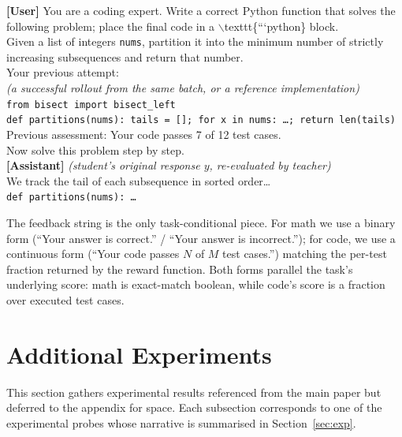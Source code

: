 \documentclass{llmxive}
\begin{document}
\begin{tcolorbox}[breakable,colback=gray!3,colframe=gray!50,title={\small Code (LiveCodeBench v6 / Dolci-RLZero) --- self-teacher context},fonttitle=\bfseries\small,boxrule=0.5pt,arc=2pt,left=4pt,right=4pt,top=2pt,bottom=2pt]
  \small\ttfamily
  {\textbf{[User]}} {You are a coding expert. Write a correct Python function that solves the following problem; place the final code in a $\backslash$texttt\{```python\} block.}\\
  {Given a list of integers \texttt{nums}, partition it into the minimum number of strictly increasing subsequences and return that number.}\\[3pt]
  Your previous attempt:\\
  \textrm{\textit{(a successful rollout from the same batch, or a reference implementation)}}\\
  \texttt{from bisect import bisect\_left}\\
  \texttt{def partitions(nums): tails = []; for x in nums: \ldots; return len(tails)}\\[3pt]
  {Previous assessment: Your code passes 7 of 12 test cases.}\\[3pt]
  Now solve this problem step by step.\\[3pt]
  {\textbf{[Assistant]}} {\textit{(student's original response $y$, re-evaluated by teacher)}}\\
  {We track the tail of each subsequence in sorted order\ldots}\\
  {\texttt{def partitions(nums): \ldots}}
\end{tcolorbox}

The feedback string is the only task-conditional piece. For math we use a binary form (``Your answer is correct.'' / ``Your answer is incorrect.''); for code, we use a continuous form (``Your code passes $N$ of $M$ test cases.'') matching the per-test fraction returned by the reward function. Both forms parallel the task's underlying score: math is exact-match boolean, while code's score is a fraction over executed test cases.

\section{Additional Experiments}
\label{app:experiments}

This section gathers experimental results referenced from the main paper but deferred to the appendix for space. Each subsection corresponds to one of the experimental probes whose narrative is summarised in Section~\ref{sec:exp}.
\end{document}
